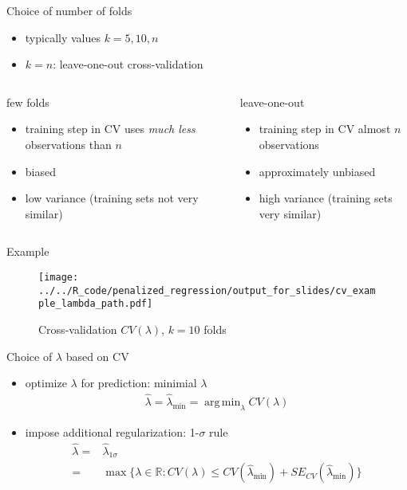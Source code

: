 \documentclass[xcolor=dvipsnames]{beamer}
\DeclareMathOperator{\argmin}{arg\,min}
\begin{document}
\begin{frame}{Choice of number of folds}
\begin{itemize}
  \item typically values $k = 5, 10, n$
  \item $k = n$: leave-one-out cross-validation
\end{itemize}
\begin{columns}[t, onlytextwidth]
        \begin{block}{few folds}
        \begin{itemize}
          \item<1-> 
          training step in CV uses \emph{much less} observations than $n$
          \item<2-> 
          biased
          \item<3-> 
          low variance (training sets not very similar)
        \end{itemize}
        \end{block}
        \begin{block}{leave-one-out}
        \begin{itemize}
          \item<1-> 
          training step in CV almost $n$ observations
          \item<2-> 
          approximately unbiased
          \item<3-> 
          high variance (training sets very similar)        
        \end{itemize}
      \end{block}
\end{columns}
\end{frame}

\begin{frame}{Example}
  \begin{figure}
  \texttt{[image: ../../R\_code/penalized\_regression/output\_for\_slides/cv\_example\_lambda\_path.pdf]}
   \caption{Cross-validation $CV(\lambda)$, $k = 10$ folds}
\end{figure}
\end{frame}

\begin{frame}{Choice of $\lambda$ based on CV}
\begin{itemize}
  \item optimize $\lambda$ for prediction: minimial $\lambda$
\begin{align*}
  \hat{\lambda} = \hat{\lambda}_{\min} = \argmin_{\lambda} CV(\lambda)
\end{align*}
\pause 
\item impose additional regularization: 1-$\sigma$ rule
\begin{align*}
  \hat{\lambda} = & \hat{\lambda}_{1\sigma} 
\\
  =&  \max \{\lambda \in \mathbb{R} : CV(\lambda) \leq CV(\hat{\lambda}_{\min}) +  SE_{CV}(\hat{\lambda}_{\min}) \}
\end{align*}
\end{itemize}
\end{frame}
\end{document}
